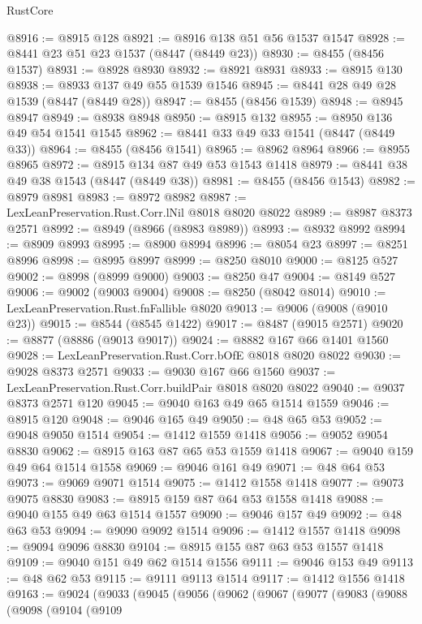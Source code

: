 \begin{lexlean}{RustCore}
\begin{coremodule}
@8916 := @8915 @128
@8921 := @8916 @138 @51 @56 @1537 @1547
@8928 := @8441 @23 @51 @23 @1537 (@8447 (@8449 @23))
@8930 := @8455 (@8456 @1537)
@8931 := @8928 @8930
@8932 := @8921 @8931
@8933 := @8915 @130
@8938 := @8933 @137 @49 @55 @1539 @1546
@8945 := @8441 @28 @49 @28 @1539 (@8447 (@8449 @28))
@8947 := @8455 (@8456 @1539)
@8948 := @8945 @8947
@8949 := @8938 @8948
@8950 := @8915 @132
@8955 := @8950 @136 @49 @54 @1541 @1545
@8962 := @8441 @33 @49 @33 @1541 (@8447 (@8449 @33))
@8964 := @8455 (@8456 @1541)
@8965 := @8962 @8964
@8966 := @8955 @8965
@8972 := @8915 @134 @87 @49 @53 @1543 @1418
@8979 := @8441 @38 @49 @38 @1543 (@8447 (@8449 @38))
@8981 := @8455 (@8456 @1543)
@8982 := @8979 @8981
@8983 := @8972 @8982
@8987 := LexLeanPreservation.Rust.Corr.lNil @8018 @8020 @8022
@8989 := @8987 @8373 @2571
@8992 := @8949 (@8966 (@8983 @8989))
@8993 := @8932 @8992
@8994 := @8909 @8993
@8995 := @8900 @8994
@8996 := @8054 @23
@8997 := @8251 @8996
@8998 := @8995 @8997
@8999 := @8250 @8010
@9000 := @8125 @527
@9002 := @8998 (@8999 @9000)
@9003 := @8250 @47
@9004 := @8149 @527
@9006 := @9002 (@9003 @9004)
@9008 := @8250 (@8042 @8014)
@9010 := LexLeanPreservation.Rust.fnFallible @8020
@9013 := @9006 (@9008 (@9010 @23))
@9015 := @8544 (@8545 @1422)
@9017 := @8487 (@9015 @2571)
@9020 := @8877 (@8886 (@9013 @9017))
@9024 := @8882 @167 @66 @1401 @1560
@9028 := LexLeanPreservation.Rust.Corr.bOfE @8018 @8020 @8022
@9030 := @9028 @8373 @2571
@9033 := @9030 @167 @66 @1560
@9037 := LexLeanPreservation.Rust.Corr.buildPair @8018 @8020 @8022
@9040 := @9037 @8373 @2571 @120
@9045 := @9040 @163 @49 @65 @1514 @1559
@9046 := @8915 @120
@9048 := @9046 @165 @49
@9050 := @48 @65 @53
@9052 := @9048 @9050 @1514
@9054 := @1412 @1559 @1418
@9056 := @9052 @9054 @8830
@9062 := @8915 @163 @87 @65 @53 @1559 @1418
@9067 := @9040 @159 @49 @64 @1514 @1558
@9069 := @9046 @161 @49
@9071 := @48 @64 @53
@9073 := @9069 @9071 @1514
@9075 := @1412 @1558 @1418
@9077 := @9073 @9075 @8830
@9083 := @8915 @159 @87 @64 @53 @1558 @1418
@9088 := @9040 @155 @49 @63 @1514 @1557
@9090 := @9046 @157 @49
@9092 := @48 @63 @53
@9094 := @9090 @9092 @1514
@9096 := @1412 @1557 @1418
@9098 := @9094 @9096 @8830
@9104 := @8915 @155 @87 @63 @53 @1557 @1418
@9109 := @9040 @151 @49 @62 @1514 @1556
@9111 := @9046 @153 @49
@9113 := @48 @62 @53
@9115 := @9111 @9113 @1514
@9117 := @1412 @1556 @1418
@9163 := @9024
    (@9033
      (@9045
        (@9056
          (@9062
            (@9067
              (@9077
                (@9083
                  (@9088
                    (@9098
                      (@9104
                        (@9109

\end{coremodule}
\end{lexlean}
